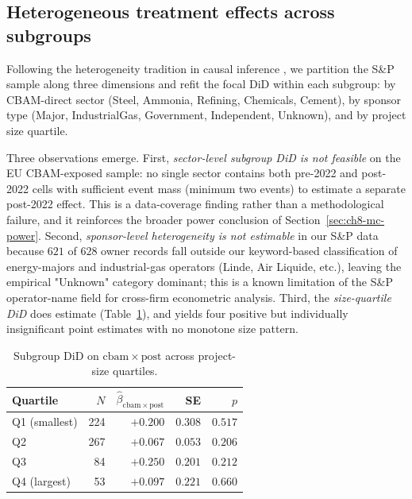 \documentclass[11pt,a4paper]{article}
\begin{document}
\subsection{Heterogeneous treatment effects across subgroups}

Following the heterogeneity tradition in causal inference \citep[e.g.,][]{rambachan2023more}, we partition the S\&P sample along three dimensions and refit the focal DiD within each subgroup: by CBAM-direct sector (Steel, Ammonia, Refining, Chemicals, Cement), by sponsor type (Major, IndustrialGas, Government, Independent, Unknown), and by project size quartile.

Three observations emerge. First, \emph{sector-level subgroup DiD is not feasible} on the EU CBAM-exposed sample: no single sector contains both pre-2022 and post-2022 cells with sufficient event mass (minimum two events) to estimate a separate post-2022 effect. This is a data-coverage finding rather than a methodological failure, and it reinforces the broader power conclusion of Section~\ref{sec:ch8-mc-power}. Second, \emph{sponsor-level heterogeneity is not estimable} in our S\&P data because $621$ of $628$ owner records fall outside our keyword-based classification of energy-majors and industrial-gas operators (Linde, Air Liquide, etc.), leaving the empirical "Unknown" category dominant; this is a known limitation of the S\&P operator-name field for cross-firm econometric analysis. Third, the \emph{size-quartile DiD} does estimate (Table~\ref{tab:ch8-size-het}), and yields four positive but individually insignificant point estimates with no monotone size pattern.

\begin{table}[ht]
\centering
\caption{Subgroup DiD on $\mathrm{cbam}\times\mathrm{post}$ across project-size quartiles.}
\label{tab:ch8-size-het}
\begin{tabular}{lrrrr}
\toprule
Quartile & $N$ & $\hat\beta_{\mathrm{cbam}\times\mathrm{post}}$ & SE & $p$ \\
\midrule
Q1 (smallest) & 224 & $+0.200$ & $0.308$ & $0.517$ \\
Q2            & 267 & $+0.067$ & $0.053$ & $0.206$ \\
Q3            & 84  & $+0.250$ & $0.201$ & $0.212$ \\
Q4 (largest)  & 53  & $+0.097$ & $0.221$ & $0.660$ \\
\bottomrule
\end{tabular}
\end{table}
\end{document}
